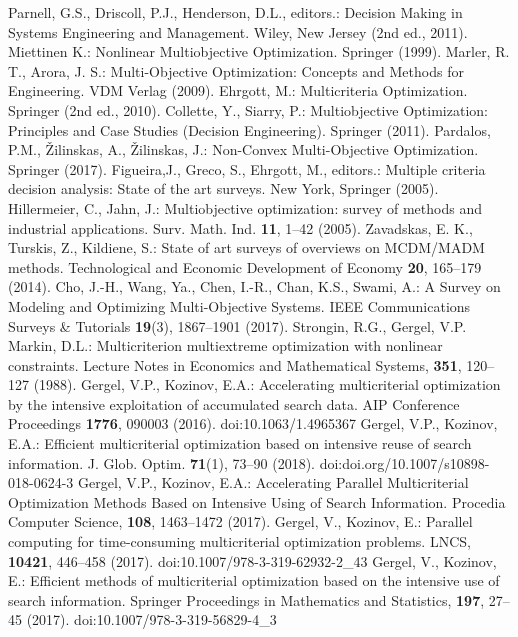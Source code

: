 \documentclass{svproc}
\providecommand{\doi}[1]{doi:\discretionary{}{}{}#1}
\begin{document}
\begin{thebibliography}{6}
 Parnell, G.S., Driscoll, P.J., Henderson, D.L., editors.: Decision Making in Systems Engineering and Management. Wiley, New Jersey (2nd ed., 2011).
 Miettinen K.: Nonlinear Multiobjective Optimization. Springer (1999).
 Marler, R. T., Arora, J. S.: Multi-Objective Optimization: Concepts and Methods for Engineering. VDM Verlag (2009).
 Ehrgott, M.: Multicriteria Optimization. Springer (2nd ed., 2010).
 Collette, Y., Siarry, P.: Multiobjective Optimization: Principles and Case Studies (Decision Engineering). Springer (2011).
 Pardalos, P.M., {\v Z}ilinskas, A., {\v Z}ilinskas, J.: Non-Convex Multi-Objective Optimization. Springer (2017). 
 Figueira,J., Greco, S., Ehrgott, M., editors.: Multiple criteria decision analysis: State of the art surveys. New York, Springer (2005).
 Hillermeier, C., Jahn, J.: Multiobjective optimization: survey of methods and industrial applications. Surv. Math. Ind. \textbf{11}, 1--42 (2005).
 Zavadskas, E. K., Turskis, Z., Kildiene, S.: State of art surveys of overviews on MCDM/MADM methods. Technological and Economic Development of Economy \textbf{20}, 165--179 (2014).
Cho, J.-H., Wang, Ya., Chen, I.-R., Chan, K.S., Swami, A.: A Survey on Modeling and Optimizing Multi-Objective Systems. IEEE Communications Surveys \& Tutorials \textbf{19}(3), 1867--1901 (2017). 
Strongin, R.G., Gergel, V.P. Markin, D.L.:  Multicriterion multiextreme optimization with nonlinear constraints. Lecture Notes in Economics and Mathematical Systems, \textbf{351}, 120--127 (1988).
Gergel, V.P., Kozinov, E.A.: Accelerating multicriterial optimization by the intensive exploitation of accumulated search data. AIP Conference Proceedings \textbf{1776}, 090003 (2016). \doi{10.1063/1.4965367}
Gergel, V.P., Kozinov, E.A.: Efficient multicriterial optimization based on intensive reuse of search information. J. Glob. Optim. \textbf{71}(1), 73--90 (2018). \doi{doi.org/10.1007/s10898-018-0624-3}
Gergel, V.P., Kozinov, E.A.: Accelerating Parallel Multicriterial Optimization Methods Based on Intensive Using of Search Information. Procedia Computer Science, \textbf{108}, 1463--1472 (2017).
Gergel, V., Kozinov, E.: Parallel computing for time-consuming multicriterial optimization problems. LNCS, \textbf{10421}, 446--458 (2017).  \doi{10.1007/978-3-319-62932-2\_43}
Gergel, V., Kozinov, E.: Efficient methods of multicriterial optimization based on the intensive use of search information. Springer Proceedings in Mathematics and Statistics, \textbf{197}, 27--45 (2017). \doi{10.1007/978-3-319-56829-4\_3}

\end{thebibliography}
\end{document}
